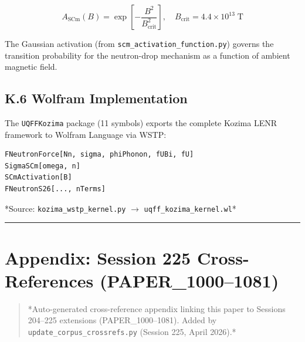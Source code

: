\documentclass[11pt]{article}
\begin{document}
$$A_{\mathrm{SCm}}(B) = \exp\!\left[-\frac{B^2}{B_{\mathrm{crit}}^2}\right], \quad B_{\mathrm{crit}} = 4.4 \times 10^{13} \;\text{T}$$

The Gaussian activation (from \verb|scm_activation_function.py|) governs the transition probability for the neutron-drop mechanism as a function of ambient magnetic field.

\subsection*{K.6 Wolfram Implementation}

The \verb|UQFFKozima| package (11 symbols) exports the complete Kozima LENR framework to Wolfram Language via WSTP:

\begin{verbatim}
FNeutronForce[Nn, sigma, phiPhonon, fUBi, fU]
SigmaSCm[omega, n]
SCmActivation[B]
FNeutronS26[..., nTerms]
\end{verbatim}

*Source: \verb|kozima_wstp_kernel.py| $\to$ \verb|uqff_kozima_kernel.wl|*

\noindent\rule{\textwidth}{0.4pt}

\section*{Appendix: Session 225 Cross-References (PAPER\_1000--1081)}

\begin{quote}
*Auto-generated cross-reference appendix linking this paper to
Sessions 204--225 extensions (PAPER\_1000--1081). Added by
\verb|update_corpus_crossrefs.py| (Session 225, April 2026).*
\end{quote}
\end{document}
